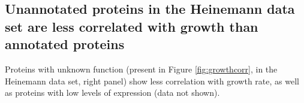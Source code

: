 \documentclass[notitlepage]{article}
\begin{document}
\subsection{Unannotated proteins in the Heinemann data set are less correlated with growth than annotated proteins}
Proteins with unknown function (present in Figure \ref{fig:growthcorr}, in the Heinemann data set, right panel) show less correlation with growth rate, as well as proteins with low levels of expression (data not shown).

\printbibliography
\end{document}
